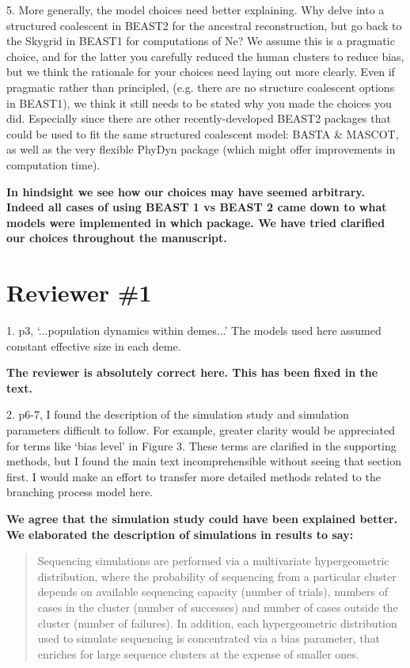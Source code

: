 \documentclass[11pt,oneside,letterpaper]{article}
\begin{document}
5. More generally, the model choices need better explaining. Why delve into a structured coalescent in BEAST2 for the ancestral reconstruction, but go back to the Skygrid in BEAST1 for computations of Ne? We assume this is a pragmatic choice, and for the latter you carefully reduced the human clusters to reduce bias, but we think the rationale for your choices need laying out more clearly. Even if pragmatic rather than principled, (e.g. there are no structure coalescent options in BEAST1), we think it still needs to be stated why you made the choices you did. Especially since there are other recently-developed BEAST2 packages that could be used to fit the same structured coalescent model: BASTA \& MASCOT, as well as the very flexible PhyDyn package (which might offer improvements in computation time).

\textbf{In hindsight we see how our choices may have seemed arbitrary. Indeed all cases of using BEAST 1 vs BEAST 2 came down to what models were implemented in which package. We have tried clarified our choices throughout the manuscript.}

%

\section*{Reviewer \#1}

1. p3, `...population dynamics within demes...'
The models used here assumed constant effective size in each deme.

\textbf{The reviewer is absolutely correct here. This has been fixed in the text.}

2. p6-7, I found the description of the simulation study and simulation parameters difficult to follow. For example, greater clarity would be appreciated for terms like `bias level' in Figure 3.
These terms are clarified in the supporting methods, but I found the main text incomprehensible without seeing that section first. I would make an effort to transfer more detailed methods related to the branching process model here.

\textbf{We agree that the simulation study could have been explained better. We elaborated the description of simulations in results to say:}

\begin{quotation}
Sequencing simulations are performed via a multivariate hypergeometric distribution, where the probability of sequencing from a particular cluster depends on available sequencing capacity (number of trials), numbers of cases in the cluster (number of successes) and number of cases outside the cluster (number of failures).
In addition, each hypergeometric distribution used to simulate sequencing is concentrated via a bias parameter, that enriches for large sequence clusters at the expense of smaller ones.
\end{quotation}
\end{document}
